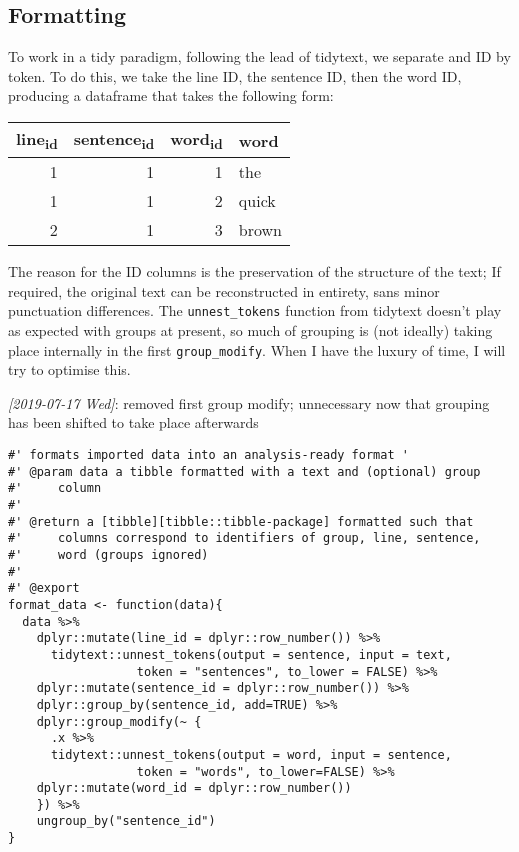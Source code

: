 \documentclass[a4paper, 11pt]{article}
\begin{document}
\subsection{Formatting}
\label{sec:org7897d8d}
To work in a tidy paradigm, following the lead of tidytext, we
separate and ID by token. To do this, we take the line ID, the
sentence ID, then the word ID, producing a dataframe that takes the
following form:

\begin{center}
\begin{tabular}{rrrl}
line\textsubscript{id} & sentence\textsubscript{id} & word\textsubscript{id} & word\\
\hline
1 & 1 & 1 & the\\
1 & 1 & 2 & quick\\
2 & 1 & 3 & brown\\
\end{tabular}
\end{center}

The reason for the ID columns is the preservation of the structure of
the text; If required, the original text can be reconstructed in
entirety, sans minor punctuation differences. The \texttt{unnest\_tokens}
function from tidytext doesn't play as expected with groups at
present, so much of grouping is (not ideally) taking place internally
in the first \texttt{group\_modify}. When I have the luxury of time, I will
try to optimise this.

\textit{[2019-07-17 Wed]}: removed first group modify; unnecessary now that
grouping has been shifted to take place afterwards

\begin{verbatim}
#' formats imported data into an analysis-ready format '
#' @param data a tibble formatted with a text and (optional) group
#'     column
#'
#' @return a [tibble][tibble::tibble-package] formatted such that
#'     columns correspond to identifiers of group, line, sentence,
#'     word (groups ignored)
#'
#' @export
format_data <- function(data){
  data %>%
    dplyr::mutate(line_id = dplyr::row_number()) %>% 
      tidytext::unnest_tokens(output = sentence, input = text,
			      token = "sentences", to_lower = FALSE) %>%
    dplyr::mutate(sentence_id = dplyr::row_number()) %>%
    dplyr::group_by(sentence_id, add=TRUE) %>%
    dplyr::group_modify(~ {
      .x %>%
	  tidytext::unnest_tokens(output = word, input = sentence,
				  token = "words", to_lower=FALSE) %>%
	dplyr::mutate(word_id = dplyr::row_number())
    }) %>%
    ungroup_by("sentence_id")
}
\end{verbatim}
\end{document}

